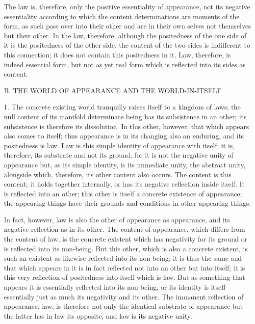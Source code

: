 The law is, therefore, only the positive essentiality of appearance,
not its negative essentiality according to which
the content determinations are moments of the form,
as such pass over into their other
and are in their own selves not themselves but their other.
In the law, therefore, although the positedness
of the one side of it is the positedness of the other side,
the content of the two sides is indifferent to this connection;
it does not contain this positedness in it.
Law, therefore, is indeed essential form,
but not as yet real form which is reflected into its sides as content.

B. THE WORLD OF APPEARANCE AND THE WORLD-IN-ITSELF

1. The concrete existing world tranquilly 
raises itself to a kingdom of laws;
the null content of its manifold determinate being 
has its subsistence in an other;
its subsistence is therefore its dissolution. 
In this other, however, that which appears also comes to itself; 
thus appearance is in its changing also an enduring,
and its positedness is law.
Law is this simple identity of appearance with itself; 
it is, therefore, its substrate and not its ground,
for it is not the negative unity of appearance 
but, as its simple identity, is its immediate unity,
the abstract unity, alongside which, therefore, 
its other content also occurs. 
The content is this content; it holds together internally,
or has its negative reflection inside itself. 
It is reflected into an other;
this other is itself a concrete existence of appearance;
the appearing things have their grounds and conditions
in other appearing things.

In fact, however, law is also 
the other of appearance as appearance, 
and its negative reflection as in its other. 
The content of appearance, 
which differs from the content of law, 
is the concrete existent 
which has negativity for its ground
or is reflected into its non-being.
But this other, which is also a concrete existent,
is such an existent as likewise reflected into its non-being;
it is thus the same and that which appears in it 
is in fact reflected not into an other but into itself; 
it is this very reflection of positedness into itself
which is law. 
But as something that appears 
it is essentially reflected into its non-being,
or its identity is itself essentially 
just as much its negativity and its other. 
The immanent reflection of appearance,
law, is therefore not only
the identical substrate of appearance
but the latter has in law its opposite,
and law is its negative unity.

